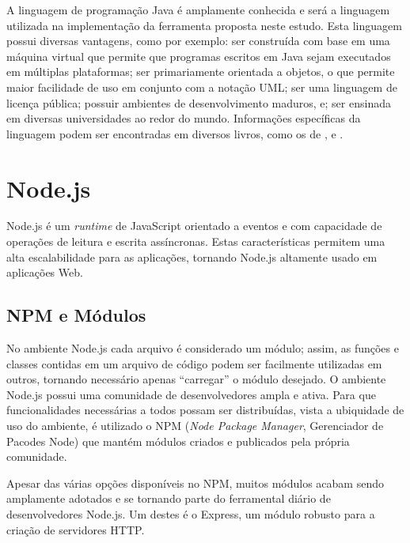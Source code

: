 A linguagem de programação Java é amplamente conhecida e será a linguagem utilizada na implementação da ferramenta proposta neste estudo. Esta linguagem possui diversas vantagens, como por exemplo: ser construída com base em uma máquina virtual que permite que programas escritos em Java sejam executados em múltiplas plataformas; ser primariamente orientada a objetos, o que permite maior facilidade de uso em conjunto com a notação UML; ser uma linguagem de licença pública; possuir ambientes de desenvolvimento maduros, e; ser ensinada em diversas universidades ao redor do mundo. Informações específicas da linguagem podem ser encontradas em diversos livros, como os de ,  e .


\section{Node.js}
\label{tec:node}

Node.js é um \textit{runtime} de JavaScript orientado a eventos \cite{NODEORG:2009} e com capacidade de operações de leitura e escrita assíncronas. Estas características permitem uma alta escalabilidade para as aplicações, tornando Node.js altamente usado em aplicações Web.


\subsection{NPM e Módulos}
\label{node:mod}

No ambiente Node.js cada arquivo é considerado um módulo; assim, as funções e classes contidas em um arquivo de código podem ser facilmente utilizadas em outros, tornando necessário apenas ``carregar'' o módulo desejado. O ambiente Node.js possui uma comunidade de desenvolvedores ampla e ativa. Para que funcionalidades necessárias a todos possam ser distribuídas, vista a ubiquidade de uso do ambiente, é utilizado o NPM (\textit{Node Package Manager}, Gerenciador de Pacodes Node) que mantém módulos criados e publicados pela própria comunidade.

Apesar das várias opções disponíveis no NPM, muitos módulos acabam sendo amplamente adotados e se tornando parte do ferramental diário de desenvolvedores Node.js. Um destes é o Express, um módulo robusto para a criação de servidores HTTP.

